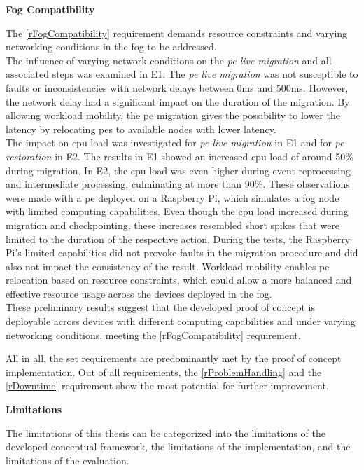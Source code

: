 \textbf{Fog Compatibility}\par
The \ref{rFogCompatibility} requirement demands resource constraints and varying networking conditions in the fog to be addressed.\\
The influence of varying network conditions on the \textit{\acrshort{pe} live migration} and all associated steps was examined in E1. The \textit{\acrshort{pe} live migration} was not susceptible to faults or inconsistencies with network delays between 0ms and 500ms. However, the network delay had a significant impact on the duration of the migration. By allowing workload mobility, the \gls{pe} migration gives the possibility to lower the latency by relocating \gls{pe}s to available nodes with lower latency.\\
The impact on \gls{cpu} load was investigated for \textit{\acrshort{pe} live migration} in E1 and for \textit{\acrshort{pe} restoration} in E2. The results in E1 showed an increased \gls{cpu} load of around 50\% during migration. In E2, the \gls{cpu} load was even higher during event reprocessing and intermediate processing, culminating at more than 90\%. These observations were made with a \gls{pe} deployed on a Raspberry Pi, which simulates a fog node with limited computing capabilities. Even though the \gls{cpu} load increased during migration and checkpointing, these increases resembled short spikes that were limited to the duration of the respective action. During the tests, the Raspberry Pi's limited capabilities did not provoke faults in the migration procedure and did also not impact the consistency of the result. Workload mobility enables \gls{pe} relocation based on resource constraints, which could allow a more balanced and effective resource usage across the devices deployed in the fog.\\
These preliminary results suggest that the developed proof of concept is deployable across devices with different computing capabilities and under varying networking conditions, meeting the \ref{rFogCompatibility} requirement.\par


All in all, the set requirements are predominantly met by the proof of concept implementation. Out of all requirements, the \ref{rProblemHandling} and the \ref{rDowntime} requirement show the most potential for further improvement.

\textbf{Limitations}\par

The limitations of this thesis can be categorized into the limitations of the developed conceptual framework, the limitations of the implementation, and the limitations of the evaluation.\par

